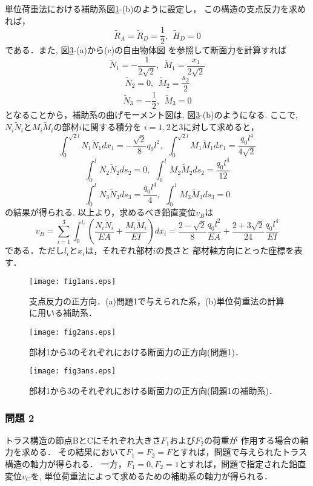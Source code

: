 \documentclass[10pt,a4j]{jarticle}
\begin{document}
	単位荷重法における補助系図\ref{fig:fig1}-(b)のように設定し，
	この構造の支点反力を求めれば，
	\[
		\tilde R_A= \tilde R_D= \frac{1}{2}, \ \ \tilde H_D=0
	\]
	である．また, 図\ref{fig:fig3}-(a)から(c)の自由物体図
	を参照して断面力を計算すれば
	\[
		\tilde N_1=-\frac{1}{2\sqrt{2}}, \ \ \tilde M_1=\frac{x_1}{2\sqrt{2}}
	\]
	\[
		\tilde N_2=0, \ \ \tilde M_2=\frac{s_2}{2}
	\]
	\[
		\tilde N_3=-\frac{1}{2}, \ \ \tilde M_3=0
	\]
	となることから，補助系の曲げモーメント図は, 図\ref{fig:fig3}-(b)のようになる.
	ここで, $N_i\tilde N_i$と$M_i\tilde M_i$の部材$i$に関する積分を
	$i=1,2$と3に対して求めると，
	\[
		\int _0^{\sqrt{2}l} N_1 \tilde N_1dx_1=-\frac{\sqrt{2}}{8}q_0l^2
		, \ \ 
		\int _0^{\sqrt{2}l} M_1 \tilde M_1dx_1=\frac{q_0l^4}{4\sqrt{2}}
	\]
	\[
		\int _0^l N_2 \tilde N_2ds_2=0, \ \ 
		\int _0^l M_2 \tilde M_2ds_2=\frac{q_0l^4}{12}
	\]
	\[
		\int _0^l N_3 \tilde N_3ds_3=\frac{q_0l^4}{4}, \ \ 
		\int _0^l M_3 \tilde M_3ds_3=0
	\]
	の結果が得られる.
	以上より，求めるべき鉛直変位$v_B$は
	\[
		v_B=
		\sum_{i=1}^3
		\int_0^{l_i} \left(
			\frac{N_i\tilde N_i}{EA}
			+
			\frac{M_i\tilde M_i}{EI}
		\right) dx_i
		=
		\frac{2-\sqrt{2}}{8}\frac{q_0l^2}{EA}
		+
		\frac{2+3\sqrt{2}}{24}
		\frac{q_0l^4}{EI}
	\]
	である．ただし$l_i$と$x_i$は，それぞれ部材$i$の長さと
	部材軸方向にとった座標を表す．
\begin{figure}[h]
	\begin{center}
	\texttt{[image: fig1ans.eps]} 
	\end{center}
	\caption{支点反力の正方向．(a)問題1で与えられた系，(b)単位荷重法の計算に用いる補助系．} 
	\label{fig:fig1}
\end{figure}
\begin{figure}[h]
	\begin{center}
	\texttt{[image: fig2ans.eps]} 
	\end{center}
	\caption{部材1から3のそれぞれにおける断面力の正方向(問題1)．}
	\label{fig:fig2}
\end{figure}
\begin{figure}[h]
	\begin{center}
	\texttt{[image: fig3ans.eps]} 
	\end{center}
	\caption{部材1から3のそれぞれにおける断面力の正方向(問題1の補助系)．}
	\label{fig:fig3}
\end{figure}
\subsubsection*{問題 2}
トラス構造の節点BとCにそれぞれ大きさ$F_1$および$F_2$の荷重が
作用する場合の軸力を求める．
その結果において$F_1=F_2=F$とすれば，問題で与えられたトラス構造の軸力が得られる．
一方，$F_1=0,F_2=1$とすれば，問題で指定された鉛直変位$v_C$を, 
単位荷重法によって求めるための補助系の軸力が得られる．\\
\end{document}

